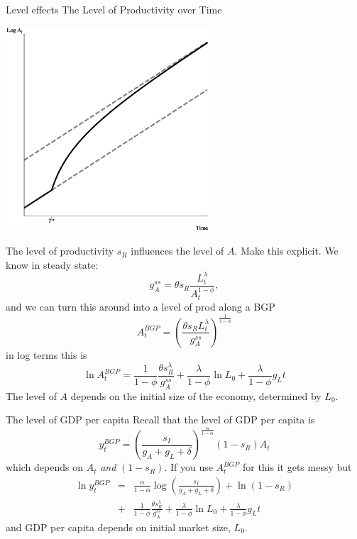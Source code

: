 \begin{frame}{Level effects}
The Level of Productivity over Time
\begin{center}
\includegraphics[height = 3in]{../Figures/fig-ch5-fig4.eps}
\end{center}
\end{frame}

\begin{frame}{The level of productivity}
$s_R$ influences the level of $A$. Make this explicit. We know in steady state:
\begin{equation}
	g_A^{ss} = \theta s_R \frac{L_t^{\lambda}}{A_t^{1-\phi}},
\end{equation}
and we can turn this around into a level of prod along a BGP
\begin{equation}
	A_t^{BGP} = \left(\frac{\theta s_R L_t^{\lambda}}{g_A^{ss}}\right)^{\frac{1}{1-\phi}}
\end{equation}
in log terms this is
\begin{equation}
	\ln A_t^{BGP} = \frac{1}{1-\phi}\frac{\theta s_R^{\lambda}}{g_A^{ss}} + \frac{\lambda}{1-\phi} \ln L_0 + \frac{\lambda}{1-\phi} g_L t
\end{equation}
The level of $A$ depends on the initial size of the economy, determined by $L_0$.
\end{frame}

\begin{frame}{The level of GDP per capita}
Recall that the level of GDP per capita is
\begin{equation}
	y_t^{BGP} = \left(\frac{s_I}{g_A + g_L + \delta}\right)^{\frac{\alpha}{1-\alpha}} (1-s_R) A_t 
\end{equation}
which depends on $A_t$ \textit{and} $(1-s_R)$. If you use $A_t^{BGP}$ for this it gets messy but
\begin{eqnarray*}
	\ln y_t^{BGP} &=& \frac{\alpha}{1-\alpha} \log \left(\frac{s_I}{g_A + g_L + \delta} \right) + \ln (1-s_R) \\ \nonumber
	&+& \frac{1}{1-\phi}\frac{\theta s_R^{\lambda}}{g_A^{ss}} + \frac{\lambda}{1-\phi} \ln L_0 + \frac{\lambda}{1-\phi} g_L t \nonumber
\end{eqnarray*}
and GDP per capita depends on initial market size, $L_0$. 
\end{frame}

